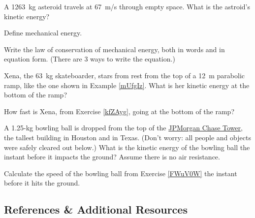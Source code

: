 \documentclass[main.tex]{subfiles}
\begin{document}
\begin{exercise} \label{X7RPxf}
    A \SI{1263}{kg} asteroid travels at \SI{67}{m/s} through empty space. What is the astroid's kinetic energy?
\end{exercise}



\begin{exercise} \label{2EkX0c}
    Define mechanical energy.
\end{exercise}

\begin{exercise}
    Write the law of conservation of mechanical energy, both in words and in equation form. (There are 3 ways to write the equation.)
\end{exercise}

\begin{exercise} \label{kfZAyg}
    Xena, the \SI{63}{kg} skateboarder, stars from rest from the top of a \SI{12}{m} parabolic ramp, like the one shown in Example \ref{mUfgIz}. What is her kinetic energy at the bottom of the ramp?
\end{exercise}

\begin{exercise} \label{5Nd1zt}
    How fast is Xena, from Exercise \ref{kfZAyg}, going at the bottom of the ramp?
\end{exercise}

\begin{exercise} \label{FWuV0W}
    A 1.25-kg bowling ball is dropped from the top of the \href{https://en.wikipedia.org/wiki/JPMorgan_Chase_Tower_(Houston)}{JPMorgan Chase Tower}, the tallest building in Houston and in Texas. (Don't worry: all people and objects were safely cleared out below.) What is the kinetic energy of the bowling ball the instant before it impacts the ground? Assume there is no air resistance.
\end{exercise}

\begin{exercise} \label{c4eP75}
    Calculate the speed of the bowling ball from Exercise \ref{FWuV0W} the instant before it hits the ground.
\end{exercise}

\cyanhrule

\subsection{References \& Additional Resources}
\end{document}

